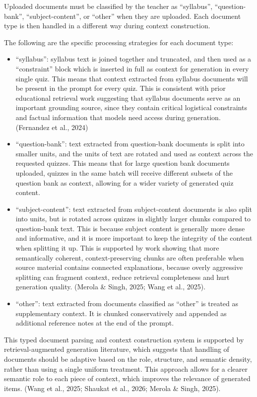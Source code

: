 \documentclass[
  12pt,
  a4paper,
]{report}
\providecommand{\tightlist}{%
  \setlength{\itemsep}{0pt}\setlength{\parskip}{0pt}}
\begin{document}
Uploaded documents must be classified by the teacher as
``syllabus'', ``question-bank'', ``subject-content'', or
``other'' when they are uploaded. Each document type is then
handled in a different way during context construction.

The following are the specific processing strategies for each document type:

\begin{itemize}
\tightlist
\item
  ``syllabus'': syllabus text is joined together and truncated, and
  then used as a ``constraint'' block which is inserted in full as
  context for generation in every single quiz. This means that context
  extracted from syllabus documents will be present in the prompt for
  every quiz. This is consistent with prior educational retrieval work
  suggesting that syllabus documents serve as an important grounding
  source, since they contain critical logistical
  constraints and factual information that models need access during
  generation. (Fernandez et al., 2024)
\item
  ``question-bank'': text extracted from question-bank documents is
  split into smaller units, and the units of text are rotated and used
  as context across the requested quizzes. This means that for large
  question bank documents uploaded, quizzes in the same batch will
  receive different subsets of the question bank as context, allowing for
  a wider variety of generated quiz content.
\item
  ``subject-content'': text extracted from subject-content
  documents is also split into units, but is rotated across quizzes in
  slightly larger chunks compared to question-bank text. This is because
  subject content is generally more dense and informative, and it is
  more important to keep the integrity of the content when splitting it up.
  This is supported by work showing that more semantically coherent,
  context-preserving chunks are often preferable when source material
  contains connected explanations, because overly aggressive splitting
  can fragment context, reduce retrieval completeness
  and hurt generation quality. (Merola \& Singh, 2025; Wang et al., 2025).
\item
  ``other'': text extracted from documents classified as
  ``other'' is treated as supplementary context. It is chunked
  conservatively and appended as additional reference notes at the end
  of the prompt.
\end{itemize}

This typed document parsing and context construction system is
supported by retrieval-augmented generation literature,
which suggests that handling of documents should be adaptive based
on the role, structure, and semantic density, rather than using
a single uniform treatment. This approach allows for a clearer semantic role to each
piece of context, which improves the relevance of generated items. (Wang et al., 2025; Shaukat et al., 2026; Merola \& Singh,
2025).
\end{document}
